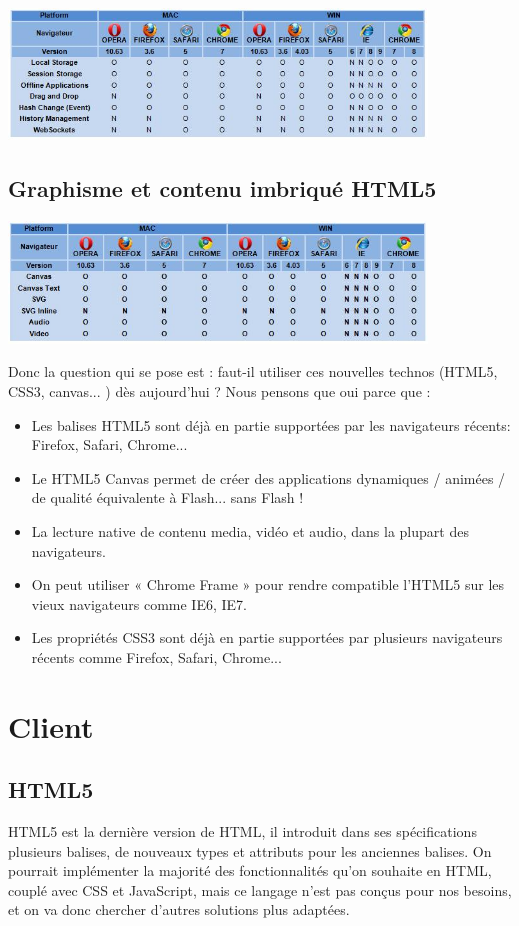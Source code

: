 \documentclass[a4paper,10pt]{report}
\begin{document}
 \includegraphics[width=420px]{img/HTML5-WebApp.jpg}

\section{Graphisme et contenu imbriqué HTML5}

 \includegraphics[width=420px]{img/Graphics.jpg}


Donc la question qui se pose est : faut-il utiliser ces nouvelles technos (HTML5, CSS3, canvas... ) dès aujourd'hui ?
Nous pensons que oui parce que :
\begin{itemize}
  \item Les balises HTML5 sont déjà en partie supportées par les navigateurs récents: Firefox, Safari, Chrome...
  \item Le HTML5 Canvas permet de créer des applications dynamiques / animées / de qualité équivalente à Flash... sans Flash !
  \item La lecture native de contenu media, vidéo et audio, dans la plupart des navigateurs.
  \item On peut utiliser « Chrome Frame » pour rendre compatible l'HTML5 sur les vieux navigateurs comme IE6, IE7.
  \item Les propriétés CSS3 sont déjà en partie supportées par plusieurs navigateurs récents comme Firefox, Safari, Chrome...
\end{itemize}

\chapter{Client}

\section{HTML5}
HTML5 est la dernière version de HTML, il introduit dans ses spécifications plusieurs 
balises, 
de nouveaux types et attributs pour les anciennes balises. 
On pourrait implémenter la majorité des fonctionnalités qu'on souhaite en HTML, couplé 
avec CSS et JavaScript, mais ce langage n'est pas conçus pour nos besoins, et on va donc 
chercher d'autres solutions plus adaptées. 
\end{document}
